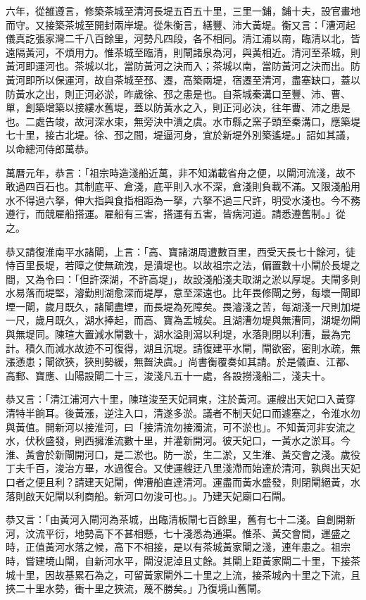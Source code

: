 六年，從雒遵言，修築茶城至清河長堤五百五十里，三里一鋪，鋪十夫，設官畫地而守。又接築茶城至開封兩岸堤。從朱衡言，繕豐、沛大黃堤。衡又言：「漕河起儀真訖張家灣二千八百餘里，河勢凡四段，各不相同。清江浦以南，臨清以北，皆遠隔黃河，不煩用力。惟茶城至臨清，則閘諸泉為河，與黃相近。清河至茶城，則黃河即運河也。茶城以北，當防黃河之決而入；茶城以南，當防黃河之決而出。防黃河即所以保運河，故自茶城至邳、遷，高築兩堤，宿遷至清河，盡塞缺口，蓋以防黃水之出，則正河必淤，昨歲徐、邳之患是也。自茶城秦溝口至豐、沛、曹、單，創築增築以接縷水舊堤，蓋以防黃水之入，則正河必決，往年曹、沛之患是也。二處告竣，故河深水束，無旁決中潰之虞。水市縣之窯子頭至秦溝口，應築堤七十里，接古北堤。徐、邳之間，堤逼河身，宜於新堤外別築遙堤。」詔如其議，以命總河侍郎萬恭。

萬曆元年，恭言：「祖宗時造淺船近萬，非不知滿載省舟之便，以閘河流淺，故不敢過四百石也。其制底平、倉淺，底平則入水不深，倉淺則負載不滿。又限淺船用水不得過六拏，伸大指與食指相距為一拏，六拏不過三尺許，明受水淺也。今不務遵行，而競雇船搭運。雇船有三害，搭運有五害，皆病河道。請悉遵舊制。」從之。

恭又請復淮南平水諸閘，上言：「高、寶諸湖周遭數百里，西受天長七十餘河，徒恃百里長堤，若障之使無疏洩，是潰堤也。以故祖宗之法，偏置數十小閘於長堤之間，又為令曰：「但許深湖，不許高堤」，故設淺船淺夫取湖之淤以厚堤。夫閘多則水易落而堤堅，濬勤則湖愈深而堤厚，意至深遠也。比年畏修閘之勞，每壞一閘即堙一閘，歲月既久，諸閘盡堙，而長堤為死障矣。畏濬淺之苦，每湖淺一尺則加堤一尺，歲月既久，湖水捧起，而高、寶為盂城矣。且湖漕勿堤與無漕同，湖堤勿閘與無堤同。陳瑄大置減水閘數十，湖水溢則瀉以利堤，水落則閉以利漕，最為完計。積久而減水故迹不可復得，湖且沉堤。請復建平水閘，閘欲密，密則水疏，無漲懣患；閘欲狹，狹則勢緩，無齧決虞。」尚書衡覆奏如其請。於是儀直、江都、高郵、寶應、山陽設閘二十三，浚淺凡五十一處，各設撈淺船二，淺夫十。

恭又言：「清江浦河六十里，陳瑄浚至天妃祠東，注於黃河。運艘出天妃口入黃穿清特半餉耳。後黃漲，逆注入口，清遂多淤。議者不制天妃口而遽塞之，令淮水勿與黃值。開新河以接淮河，曰「接清流勿接濁流，可不淤也」。不知黃河非安流之水，伏秋盛發，則西擁淮流數十里，并灌新開河。彼天妃口，一黃水之淤耳。今淮、黃會於新閘開河口，是二淤也。防一淤，生二淤，又生淮、黃交會之淺。歲役丁夫千百，浚治方畢，水過復合。又使運艘迂八里淺滯而始達於清河，孰與出天妃口者之便且利？請建天妃閘，俾漕船直達清河。運盡而黃水盛發，則閉閘絕黃，水落則啟天妃閘以利商船。新河口勿浚可也。」。乃建天妃廟口石閘。

恭又言：「由黃河入閘河為茶城，出臨清板閘七百餘里，舊有七十二淺。自創開新河，汶流平衍，地勢高下不甚相懸，七十淺悉為通渠。惟茶、黃交會間，運盛之時，正值黃河水落之候，高下不相接，是以有茶城黃家閘之淺，連年患之。祖宗時，嘗建境山閘，自新河水平，閘沒泥淖且丈餘。其閘上距黃家閘二十里，下接茶城十里，因故基累石為之，可留黃家閘外二十里之上流，接茶城內十里之下流，且挾二十里水勢，衝十里之狹流，蔑不勝矣。」乃復境山舊閘。

